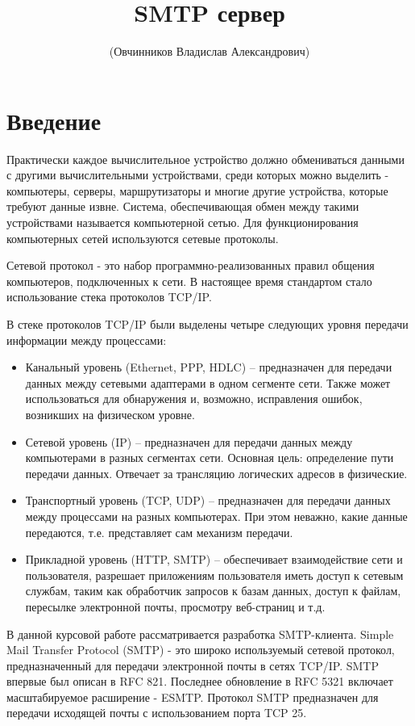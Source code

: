 \documentclass[a4paper,12pt]{report}
\title{SMTP сервер\textnumero 1}
\author{(Овчинников Владислав Александрович)}
\begin{document}
	\maketitle

	\tableofcontents

	\chapter*{Введение}
	Практически каждое вычислительное устройство должно обмениваться данными с другими вычислительными устройствами, среди которых можно выделить - компьютеры, серверы, маршрутизаторы и многие другие устройства, которые требуют данные извне. Система, обеспечивающая обмен между такими устройствами называется компьютерной сетью. Для функционирования компьютерных сетей используются сетевые протоколы.

	Сетевой протокол - это набор программно-реализованных правил общения компьютеров, подключенных к сети. В настоящее время стандартом стало использование стека протоколов TCP/IP.
	
	В стеке протоколов TCP/IP были выделены четыре следующих уровня передачи информации между процессами:
	
	\begin{itemize}
		\item Канальный уровень (Ethernet, PPP, HDLC) -- предназначен для передачи данных между сетевыми адаптерами в одном сегменте сети. Также может использоваться для обнаружения и, возможно, исправления ошибок, возникших на физическом уровне.
		\item Сетевой уровень (IP) -- предназначен для передачи данных между компьютерами в разных сегментах сети. Основная цель: определение пути передачи данных. Отвечает за трансляцию логических адресов в физические. 
		\item Транспортный уровень (TCP, UDP) -- предназначен для передачи данных между процессами на разных компьютерах. При этом неважно, какие данные передаются, т.е. представляет сам механизм передачи.
		\item Прикладной уровень (HTTP, SMTP) -- обеспечивает взаимодействие сети и пользователя, разрешает приложениям пользователя иметь доступ к сетевым службам, таким как обработчик запросов к базам данных, доступ к файлам, пересылке электронной почты, просмотру веб-страниц и т.д.
	\end{itemize}

	В данной курсовой работе рассматривается разработка SMTP-клиента. Simple Mail Transfer Protocol (SMTP) - это широко используемый сетевой протокол, предназначенный для передачи электронной почты в сетях TCP/IP. SMTP впервые был описан в RFC 821. Последнее обновление в RFC 5321 включает масштабируемое расширение - ESMTP. Протокол SMTP предназначен для передачи исходящей почты с использованием порта TCP 25.
\end{document}
